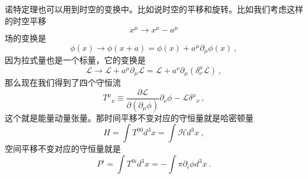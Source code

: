 诺特定理也可以用到时空的变换中。比如说时空的平移和旋转。比如我们考虑这样的时空平移
\begin{equation}
x^\mu \rightarrow x^\mu - a^\mu 
\end{equation}
场的变换是
\begin{equation}
\phi(x) \rightarrow \phi (x+a) = \phi (x) + a^\mu \partial_\mu \phi(x)~,
\end{equation}
因为拉式量也是一个标量，它的变换是
\begin{equation}
\mathcal L \rightarrow \mathcal L + a^\mu \partial_\mu \mathcal L  = \mathcal L + a^\nu \partial_\mu (\delta^\mu_\nu \mathcal L)~,
\end{equation}
那么现在我们得到了四个守恒流
\begin{equation}\label{eq_classi_2}
T^\mu{}_\nu \equiv \frac{\partial \mathcal L}{\partial (\partial_\mu \phi)} \partial_\nu \phi - \mathcal L \delta^\mu{}_\nu~,
\end{equation}
这个就是能量动量张量。那时间平移不变对应的守恒量就是哈密顿量
\begin{equation}
H = \int T^{00} d^3 x = \int \mathcal H d^3 x~,
\end{equation}
空间平移不变对应的守恒量就是
\begin{equation}
P^i = \int T^{0i} d^3x = - \int \pi \partial_i \phi d^3 x ~.
\end{equation}
















